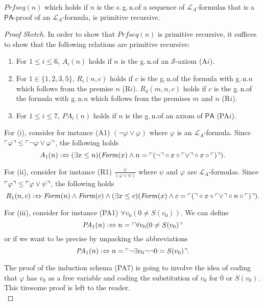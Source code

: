 \begin{thm}\label{thm:Prfseqpr}
$\mathit{Prfseq}(n)$ which holds if $n$ is the s.\,g.\,n.\@ of a sequence of $\mathcal{L}_A$-formulas that is a $\mathsf{PA}$-proof of an $\mathcal{L}_A$-formula, is primitive recursive.
\end{thm}
\begin{proof}[Proof Sketch]
In order to show that $\mathit{Prfseq}(n)$ is primitive recursive, it suffices to show that the following relations are primitive recursive:
\begin{enumerate}
\item For $1 \le i \le 6$, $A_i(n)$ holds if $n$ is the g.\,n.\@ of an $\mathcal{S}$-axiom (A$i$).
\item For $1 \in \lbrace 1, 2, 3, 5 \rbrace$, $R_i(n,c)$ holds if $c$ is the g.\,n.\@ of the formula with g.\,n.\@ $n$ which follows from the premise $n$ (R$i$). $R_4(m, n,c)$ holds if $c$ is the g.\,n.\@ of the formula with g.\,n.\@ $n$ which follows from the premises $m$ and $n$ (R$i$).
\item For $1 \le i \le 7$, $\mathit{PA}_i(n)$ holds if $n$ is the g.\,n.\@ of an axiom of $\mathsf{PA}$ (PA$i$). 
\end{enumerate}

For (i), consider for instance (A1) $(\lnot \varphi \vee \varphi)$ where $\varphi$ is an $\mathcal{L}_A$-formula. Since $\ulcorner \varphi \urcorner \le \ulcorner \lnot \varphi \vee \varphi \urcorner$, the following holds
\[A_1(n) \vcentcolon \Leftrightarrow (\exists x \le n)(\mathit{Form}(x) \wedge n = \ulcorner ( \lnot\urcorner \circ x \circ \ulcorner \vee \urcorner \circ x  \circ \ulcorner )\urcorner).\] 

For (ii), consider for instance (R1) \(\displaystyle \frac{\psi}{(\varphi \vee \psi)}  \) where $\psi$ and $\varphi$ are $\mathcal{L}_A$-formulas. Since  $\ulcorner \varphi \urcorner \le \ulcorner  \varphi \vee \psi \urcorner $, the following holds
\[ R_1(n,c) \vcentcolon \Leftrightarrow \mathit{Form}(n) \wedge \mathit{Form}(c) \wedge (\exists x \le c) (\mathit{Form}(x) \wedge c = \ulcorner ( \urcorner \circ x \circ \ulcorner \vee \urcorner \circ n \circ \ulcorner ) \urcorner ). \]

For (iii), consider for instance (PA1) $\forall v_0 (0 \neq S (v_0))$. We can define 
\[\mathit{PA}_1(n) \vcentcolon \Leftrightarrow n = \ulcorner \forall v_0 (0 \neq S (v_0) \urcorner \]
or if we want to be precise by unpacking the abbreviations
\[\mathit{PA}_1(n) \vcentcolon \Leftrightarrow n = \ulcorner \lnot \exists v_0 \lnot \lnot 0 = S(v_0) \urcorner. \]

The proof of the induction schema (PA7) is going to involve the idea of coding that $\varphi$ has $v_0$ as a free variable and coding the substitution of $v_0$ for $\overline{0}$ or $S(v_0)$. This tiresome proof is left to the reader.
\\


\end{proof}
